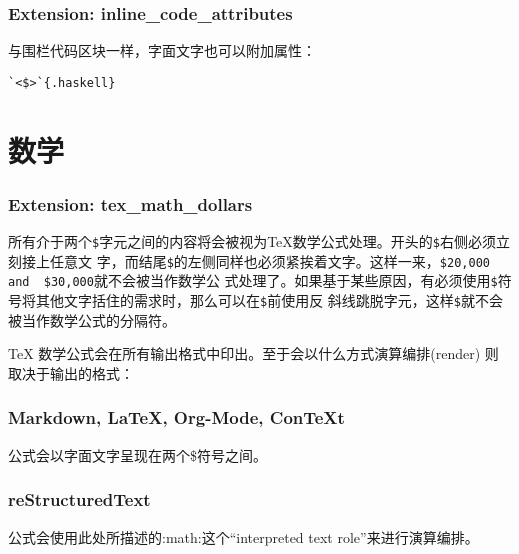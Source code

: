 \documentclass[cn]{elegantbook}
\newcommand{\passthrough}[1]{#1}
\begin{document}
\hypertarget{extension-inline_code_attributes}{%
\subsubsection{Extension:
inline\_code\_attributes}\label{extension-inline_code_attributes}}

与围栏代码区块一样，字面文字也可以附加属性：

\begin{lstlisting}
`<$>`{.haskell}
\end{lstlisting}

\hypertarget{ux6570ux5b66}{%
\section{数学}\label{ux6570ux5b66}}

\hypertarget{extension-tex_math_dollars}{%
\subsubsection{Extension:
tex\_math\_dollars}\label{extension-tex_math_dollars}}

所有介于两个\passthrough{\lstinline!$!}字元之间的内容将会被视为TeX数学公式处理。开头的\passthrough{\lstinline!$!}右侧必须立刻接上任意文
字，而结尾\passthrough{\lstinline!$!}的左侧同样也必须紧挨着文字。这样一来，\passthrough{\lstinline!$20,000  and  $30,000!}就不会被当作数学公
式处理了。如果基于某些原因，有必须使用\passthrough{\lstinline!$!}符号将其他文字括住的需求时，那么可以在\passthrough{\lstinline!$!}前使用反
斜线跳脱字元，这样\passthrough{\lstinline!$!}就不会被当作数学公式的分隔符。

TeX 数学公式会在所有输出格式中印出。至于会以什么方式演算编排(render)
则取决于输出的格式：

\hypertarget{markdown-latex-org-mode-context}{%
\subsubsection{Markdown, LaTeX, Org-Mode,
ConTeXt}\label{markdown-latex-org-mode-context}}

公式会以字面文字呈现在两个\$符号之间。

\hypertarget{restructuredtext}{%
\subsubsection{reStructuredText}\label{restructuredtext}}

公式会使用此处所描述的:math:这个``interpreted text
role''来进行演算编排。
\end{document}
